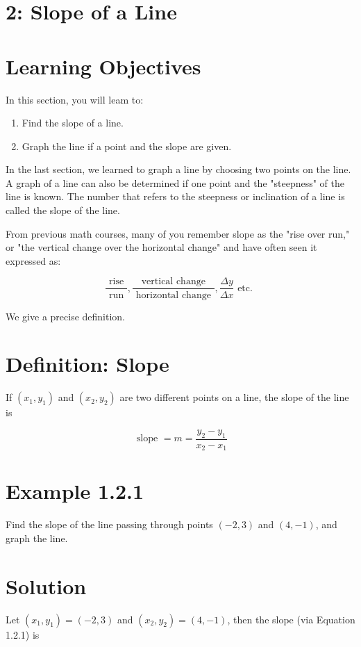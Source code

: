\section*{2: Slope of a Line}
\section*{Learning Objectives}
In this section, you will leam to:

\begin{enumerate}
  \item Find the slope of a line.
  \item Graph the line if a point and the slope are given.
\end{enumerate}

In the last section, we learned to graph a line by choosing two points on the line. A graph of a line can also be determined if one point and the "steepness" of the line is known. The number that refers to the steepness or inclination of a line is called the slope of the line.

From previous math courses, many of you remember slope as the "rise over run," or "the vertical change over the horizontal change" and have often seen it expressed as:

$$
\frac{\text { rise }}{\text { run }}, \frac{\text { vertical change }}{\text { horizontal change }}, \frac{\Delta y}{\Delta x} \text { etc. }
$$

We give a precise definition.

\section*{Definition: Slope}
If $\left(x_{1}, y_{1}\right)$ and $\left(x_{2}, y_{2}\right)$ are two different points on a line, the slope of the line is


\begin{equation*}
\text { slope }=m=\frac{y_{2}-y_{1}}{x_{2}-x_{1}} \tag{1.2.1}
\end{equation*}


\section*{Example 1.2.1}
Find the slope of the line passing through points $(-2,3)$ and $(4,-1)$, and graph the line.

\section*{Solution}
Let $\left(x_{1}, y_{1}\right)=(-2,3)$ and $\left(x_{2}, y_{2}\right)=(4,-1)$, then the slope (via Equation 1.2.1) is

